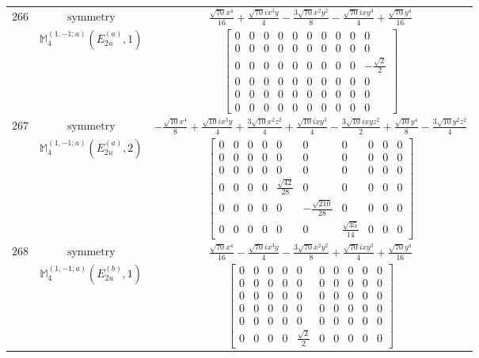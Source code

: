 \documentclass[fleqn,8pt,landscape]{jsarticle}
\begin{document}
\begin{longtable}{ccc}
$ 266 $ & $ \text{symmetry} $ & $ \frac{\sqrt{70} x^{4}}{16} + \frac{\sqrt{70} i x^{3} y}{4} - \frac{3 \sqrt{70} x^{2} y^{2}}{8} - \frac{\sqrt{70} i x y^{3}}{4} + \frac{\sqrt{70} y^{4}}{16} $ \\
$  $ & $ \mathbb{M}_{4}^{(1,-1;a)}(E_{2u}^{(a)},1) $ & $ \begin{bmatrix} 0 & 0 & 0 & 0 & 0 & 0 & 0 & 0 & 0 & 0 \\ 0 & 0 & 0 & 0 & 0 & 0 & 0 & 0 & 0 & 0 \\ 0 & 0 & 0 & 0 & 0 & 0 & 0 & 0 & 0 & - \frac{\sqrt{2}}{2} \\ 0 & 0 & 0 & 0 & 0 & 0 & 0 & 0 & 0 & 0 \\ 0 & 0 & 0 & 0 & 0 & 0 & 0 & 0 & 0 & 0 \\ 0 & 0 & 0 & 0 & 0 & 0 & 0 & 0 & 0 & 0 \end{bmatrix} $ \\ \hline
$ 267 $ & $ \text{symmetry} $ & $ - \frac{\sqrt{10} x^{4}}{8} + \frac{\sqrt{10} i x^{3} y}{4} + \frac{3 \sqrt{10} x^{2} z^{2}}{4} + \frac{\sqrt{10} i x y^{3}}{4} - \frac{3 \sqrt{10} i x y z^{2}}{2} + \frac{\sqrt{10} y^{4}}{8} - \frac{3 \sqrt{10} y^{2} z^{2}}{4} $ \\
$  $ & $ \mathbb{M}_{4}^{(1,-1;a)}(E_{2u}^{(a)},2) $ & $ \begin{bmatrix} 0 & 0 & 0 & 0 & 0 & 0 & 0 & 0 & 0 & 0 \\ 0 & 0 & 0 & 0 & 0 & 0 & 0 & 0 & 0 & 0 \\ 0 & 0 & 0 & 0 & 0 & 0 & 0 & 0 & 0 & 0 \\ 0 & 0 & 0 & 0 & \frac{\sqrt{42}}{28} & 0 & 0 & 0 & 0 & 0 \\ 0 & 0 & 0 & 0 & 0 & - \frac{\sqrt{210}}{28} & 0 & 0 & 0 & 0 \\ 0 & 0 & 0 & 0 & 0 & 0 & \frac{\sqrt{35}}{14} & 0 & 0 & 0 \end{bmatrix} $ \\ \hline
$ 268 $ & $ \text{symmetry} $ & $ \frac{\sqrt{70} x^{4}}{16} - \frac{\sqrt{70} i x^{3} y}{4} - \frac{3 \sqrt{70} x^{2} y^{2}}{8} + \frac{\sqrt{70} i x y^{3}}{4} + \frac{\sqrt{70} y^{4}}{16} $ \\
$  $ & $ \mathbb{M}_{4}^{(1,-1;a)}(E_{2u}^{(b)},1) $ & $ \begin{bmatrix} 0 & 0 & 0 & 0 & 0 & 0 & 0 & 0 & 0 & 0 \\ 0 & 0 & 0 & 0 & 0 & 0 & 0 & 0 & 0 & 0 \\ 0 & 0 & 0 & 0 & 0 & 0 & 0 & 0 & 0 & 0 \\ 0 & 0 & 0 & 0 & 0 & 0 & 0 & 0 & 0 & 0 \\ 0 & 0 & 0 & 0 & 0 & 0 & 0 & 0 & 0 & 0 \\ 0 & 0 & 0 & 0 & \frac{\sqrt{2}}{2} & 0 & 0 & 0 & 0 & 0 \end{bmatrix} $ \\ \hline

\end{longtable}
\end{document}
